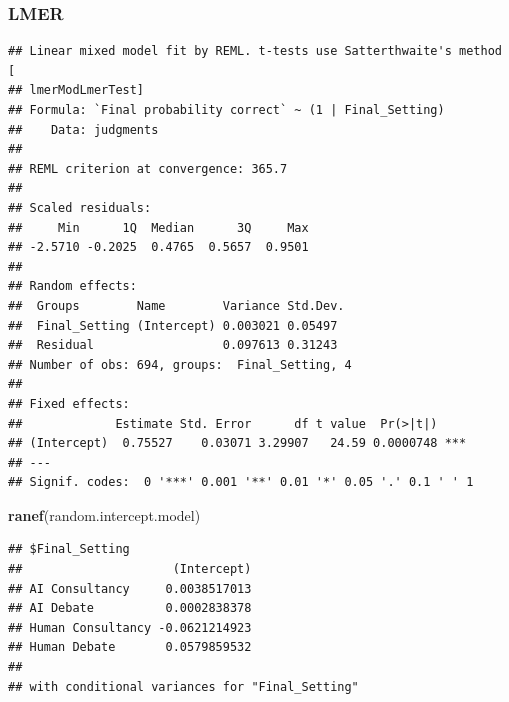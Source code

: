 \documentclass[
]{article}
\newenvironment{Shaded}{\begin{snugshade}}{\end{snugshade}}
\newcommand{\AttributeTok}[1]{\textcolor[rgb]{0.13,0.29,0.53}{#1}}
\newcommand{\ConstantTok}[1]{\textcolor[rgb]{0.56,0.35,0.01}{#1}}
\newcommand{\DecValTok}[1]{\textcolor[rgb]{0.00,0.00,0.81}{#1}}
\newcommand{\FunctionTok}[1]{\textcolor[rgb]{0.13,0.29,0.53}{\textbf{#1}}}
\newcommand{\NormalTok}[1]{#1}
\newcommand{\OtherTok}[1]{\textcolor[rgb]{0.56,0.35,0.01}{#1}}
\newcommand{\SpecialCharTok}[1]{\textcolor[rgb]{0.81,0.36,0.00}{\textbf{#1}}}
\newcommand{\StringTok}[1]{\textcolor[rgb]{0.31,0.60,0.02}{#1}}
\begin{document}
\subsubsection{LMER}\label{lmer}

\begin{Shaded}
\end{Shaded}

\begin{verbatim}
## Linear mixed model fit by REML. t-tests use Satterthwaite's method [
## lmerModLmerTest]
## Formula: `Final probability correct` ~ (1 | Final_Setting)
##    Data: judgments
## 
## REML criterion at convergence: 365.7
## 
## Scaled residuals: 
##     Min      1Q  Median      3Q     Max 
## -2.5710 -0.2025  0.4765  0.5657  0.9501 
## 
## Random effects:
##  Groups        Name        Variance Std.Dev.
##  Final_Setting (Intercept) 0.003021 0.05497 
##  Residual                  0.097613 0.31243 
## Number of obs: 694, groups:  Final_Setting, 4
## 
## Fixed effects:
##             Estimate Std. Error      df t value  Pr(>|t|)    
## (Intercept)  0.75527    0.03071 3.29907   24.59 0.0000748 ***
## ---
## Signif. codes:  0 '***' 0.001 '**' 0.01 '*' 0.05 '.' 0.1 ' ' 1
\end{verbatim}

\begin{Shaded}
\begin{Highlighting}[]
\FunctionTok{ranef}\NormalTok{(random.intercept.model)}
\end{Highlighting}
\end{Shaded}

\begin{verbatim}
## $Final_Setting
##                     (Intercept)
## AI Consultancy     0.0038517013
## AI Debate          0.0002838378
## Human Consultancy -0.0621214923
## Human Debate       0.0579859532
## 
## with conditional variances for "Final_Setting"
\end{verbatim}
\end{document}
